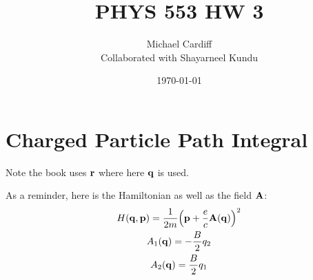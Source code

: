 \documentclass[12pt]{article}
\title{\vspace{-4em}PHYS 553 HW 3}
\author{Michael Cardiff\\Collaborated with Shayarneel Kundu}
\date{\today}
\newcommand{\q}{\vb{q}}
\newcommand{\p}{\vb{p}}
\begin{document}
\maketitle

\section{Charged Particle Path Integral}
Note the book uses $\vb{r}$ where here $\q$ is used.

As a reminder, here is the Hamiltonian as well as the field $\vb{A}$:
\begin{gather*}
  H(\q,\p)=\frac{1}{2m}\qty(\p+\frac{e}{c}\vb{A}(\q))^2\\
  A_1(\q)=-\frac{B}{2}q_2\\ A_2(\q)=\frac{B}{2}q_1
\end{gather*}
\end{document}
